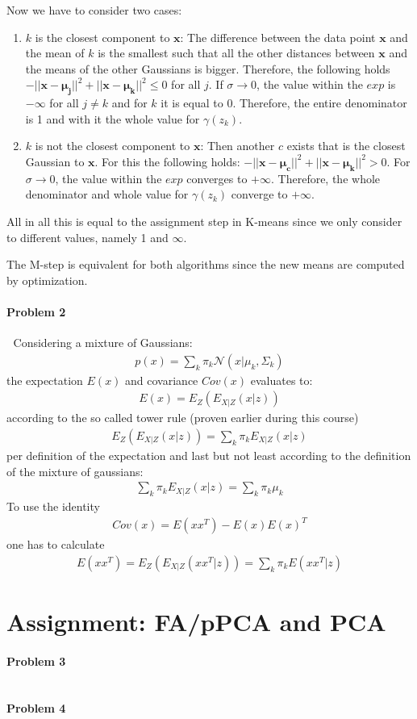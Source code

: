 \documentclass{article}
\renewcommand{\Vec}[1]{\ensuremath{\mathbf{#1}}}
\begin{document}
Now we have to consider two cases:
\begin{enumerate}
\item $k$ is the closest component to $\Vec{x}$: The difference between the data point $\Vec{x}$ and the mean of $k$ is the smallest such that all the other distances between $\Vec{x}$ and the means of the other Gaussians is bigger. Therefore, the following holds $-||\Vec{x}-\Vec{\mu_j}||^2 + ||\Vec{x}-\Vec{\mu_k}||^2 \leq 0$ for all $j$. If $\sigma \rightarrow 0$, the value within the $exp$ is $-\infty$ for all $j \neq k$ and for $k$ it is equal to 0. Therefore, the entire denominator is 1 and with it the whole value for $\gamma(z_k)$.
\item $k$ is not the closest component to $\Vec{x}$: Then another $c$ exists that is the closest Gaussian to $\Vec{x}$. For this the following holds: $-||\Vec{x}-\Vec{\mu_c}||^2 + ||\Vec{x}-\Vec{\mu_k}||^2 > 0$. For $\sigma \rightarrow 0$, the value within the $exp$ converges to $+\infty$. Therefore, the whole denominator and whole value for $\gamma(z_k)$ converge to $+\infty$.
\end{enumerate}

All in all this is equal to the assignment step in K-means since we only consider to different values, namely 1 and $\infty$.

The M-step is equivalent for both algorithms since the new means are computed by optimization.
 

\paragraph*{Problem 2}
$\;$ 
Considering a mixture of Gaussians:
\begin{eqnarray}
p(x) = \sum_k \pi_k \mathcal{N}(x|\mu_k,\Sigma_k)
\end{eqnarray}
the expectation $E(x)$ and covariance $Cov(x)$ evaluates to:
\begin{eqnarray}
E(x) = E_Z(E_{X|Z}(x|z))
\end{eqnarray}
according to the so called tower rule (proven earlier during this course)
\begin{eqnarray}
E_Z(E_{X|Z}(x|z)) = \sum_k \pi_kE_{X|Z}(x|z)
\end{eqnarray}
per definition of the expectation and last but not least according to the definition of the mixture of gaussians:
\begin{eqnarray}
\sum_k \pi_kE_{X|Z}(x|z) = \sum_k \pi_k\mu_k
\end{eqnarray}
To use the identity
\begin{eqnarray}
Cov(x) = E(xx^T) - E(x)E(x)^T
\end{eqnarray}
one has to calculate
\begin{eqnarray}
E(xx^T) = E_Z(E_{X|Z}(xx^T|z)) = \sum_k \pi_k E(xx^T|z)
\end{eqnarray}


\section{Assignment: FA/pPCA and PCA}
\paragraph*{Problem 3}
$\;$



\paragraph*{Problem 4}
$\;$ 
\end{document}
